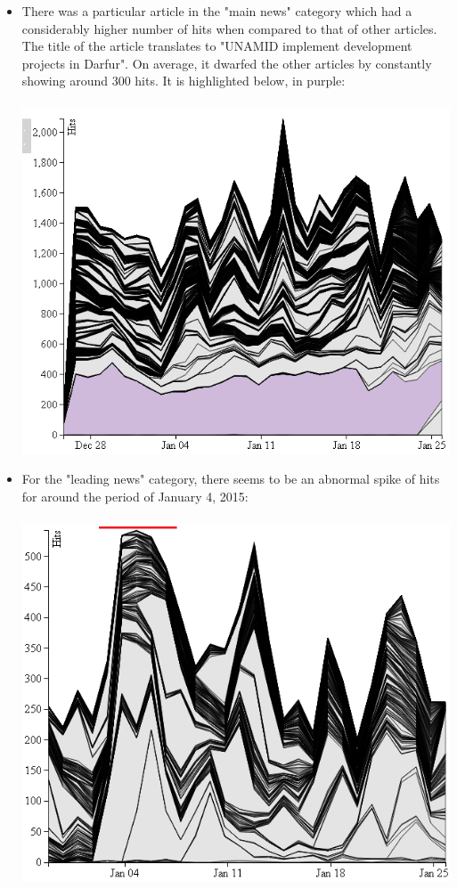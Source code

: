 \documentclass[12pt]{article}
\begin{document}
{\begin{itemize}
\item There was a particular article in the "main news" category which had a considerably higher number of hits when compared to that of other articles. The title of the article translates to "UNAMID implement development projects in Darfur". On average, it dwarfed the other articles by constantly showing around 300 hits. It is highlighted below, in purple: \\ \\
\noindent\includegraphics[scale=0.8]{img/obz1}

\newpage

\item For the "leading news" category, there seems to be an abnormal spike of hits for around the period of January 4, 2015: \\ \\
\noindent\includegraphics[scale=0.6]{img/obz2}


\end{itemize}}
\end{document}
